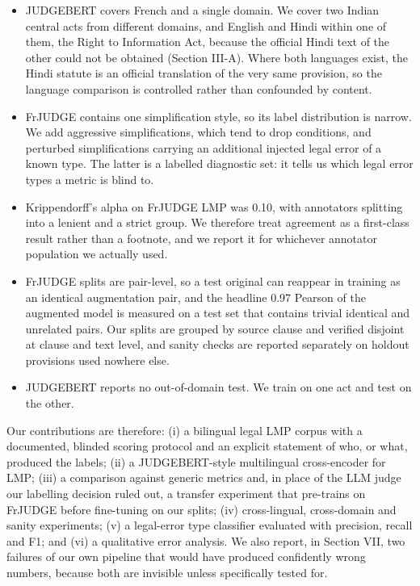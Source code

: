 \documentclass[conference]{IEEEtran}
\begin{document}
\begin{itemize}
\item JUDGEBERT covers French and a single domain. We cover two Indian central acts from different domains, and English and Hindi within one of them, the Right to Information Act, because the official Hindi text of the other could not be obtained (Section III-A). Where both languages exist, the Hindi statute is an official translation of the very same provision, so the language comparison is controlled rather than confounded by content.
\item FrJUDGE contains one simplification style, so its label distribution is narrow. We add aggressive simplifications, which tend to drop conditions, and perturbed simplifications carrying an additional injected legal error of a known type. The latter is a labelled diagnostic set: it tells us which legal error types a metric is blind to.
\item Krippendorff's alpha on FrJUDGE LMP was 0.10, with annotators splitting into a lenient and a strict group. We therefore treat agreement as a first-class result rather than a footnote, and we report it for whichever annotator population we actually used.
\item FrJUDGE splits are pair-level, so a test original can reappear in training as an identical augmentation pair, and the headline 0.97 Pearson of the augmented model is measured on a test set that contains trivial identical and unrelated pairs. Our splits are grouped by source clause and verified disjoint at clause and text level, and sanity checks are reported separately on holdout provisions used nowhere else.
\item JUDGEBERT reports no out-of-domain test. We train on one act and test on the other.
\end{itemize}

Our contributions are therefore: (i) a bilingual legal LMP corpus with a documented, blinded scoring protocol and an explicit statement of who, or what, produced the labels; (ii) a JUDGEBERT-style multilingual cross-encoder for LMP; (iii) a comparison against generic metrics and, in place of the LLM judge our labelling decision ruled out, a transfer experiment that pre-trains on FrJUDGE before fine-tuning on our splits; (iv) cross-lingual, cross-domain and sanity experiments; (v) a legal-error type classifier evaluated with precision, recall and F1; and (vi) a qualitative error analysis. We also report, in Section VII, two failures of our own pipeline that would have produced confidently wrong numbers, because both are invisible unless specifically tested for.
\end{document}
